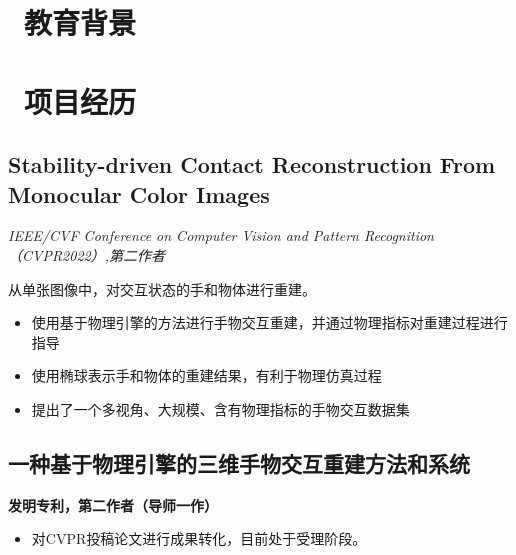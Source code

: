 \documentclass{resume}
\begin{document}



\section{\faGraduationCap\ 教育背景}
\vspace{2mm}

\section{\faUsers\ 项目经历}
\subsection{\textbf{Stability-driven Contact Reconstruction From Monocular Color Images}}
\textit{IEEE/CVF Conference on Computer Vision and Pattern Recognition（CVPR2022）,第二作者}

\begin{onehalfspacing}
从单张图像中，对交互状态的手和物体进行重建。
\begin{itemize}
  \item 使用基于物理引擎的方法进行手物交互重建，并通过物理指标对重建过程进行指导
  \item 使用椭球表示手和物体的重建结果，有利于物理仿真过程
  \item 提出了一个多视角、大规模、含有物理指标的手物交互数据集
\end{itemize}
\end{onehalfspacing}


\subsection{\textbf{一种基于物理引擎的三维手物交互重建方法和系统}}
\textbf{发明专利，第二作者（导师一作）}
\begin{onehalfspacing}
\begin{itemize}
    \item 对CVPR投稿论文进行成果转化，目前处于受理阶段。
\end{itemize}
\end{onehalfspacing}
\end{document}
